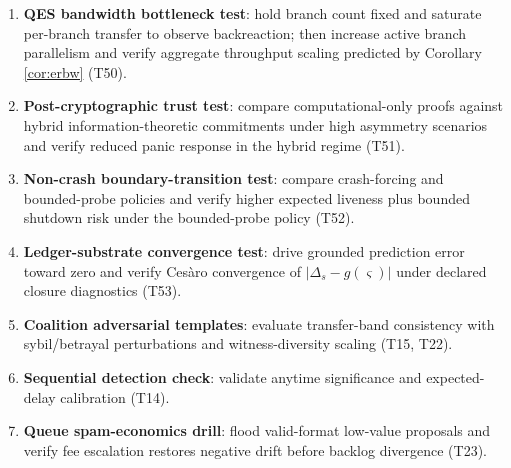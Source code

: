 \documentclass[11pt,a4paper]{article}
\theoremstyle{definition}
\theoremstyle{remark}
\begin{document}
\begin{enumerate}
  \item \textbf{QES bandwidth bottleneck test}: hold branch count fixed and saturate per-branch transfer to observe backreaction; then increase active branch parallelism and verify aggregate throughput scaling predicted by Corollary \ref{cor:erbw} (T50).
  \item \textbf{Post-cryptographic trust test}: compare computational-only proofs against hybrid information-theoretic commitments under high asymmetry scenarios and verify reduced panic response in the hybrid regime (T51).
  \item \textbf{Non-crash boundary-transition test}: compare crash-forcing and bounded-probe policies and verify higher expected liveness plus bounded shutdown risk under the bounded-probe policy (T52).
  \item \textbf{Ledger-substrate convergence test}: drive grounded prediction error toward zero and verify Ces\`aro convergence of $|\Delta_s-g(\varsigma)|$ under declared closure diagnostics (T53).
  \item \textbf{Coalition adversarial templates}: evaluate transfer-band consistency with sybil/betrayal perturbations and witness-diversity scaling (T15, T22).
  \item \textbf{Sequential detection check}: validate anytime significance and expected-delay calibration (T14).
  \item \textbf{Queue spam-economics drill}: flood valid-format low-value proposals and verify fee escalation restores negative drift before backlog divergence (T23).
\end{enumerate}
\end{document}
